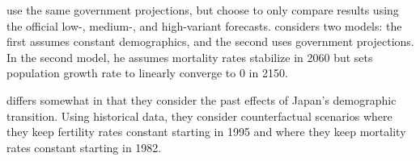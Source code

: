 \documentclass[10pt]{article}
\numberwithin{equation}{subsection}
\begin{document}
\par \cite{IKY2016} use the same government projections, but choose to only compare results using the official \mbox{low-,} \mbox{medium-,} and high-variant forecasts. \cite{K2015} considers two models: the first assumes constant demographics, and the second uses government projections. In the second model, he assumes mortality rates stabilize in 2060 but sets population growth rate to linearly converge to 0 in 2150.

\par \cite{MOS2016} differs somewhat in that they consider the past effects of Japan's demographic transition. Using historical data, they consider counterfactual scenarios where they keep fertility rates constant starting in 1995 and where they keep mortality rates constant starting in 1982.



\end{document}
